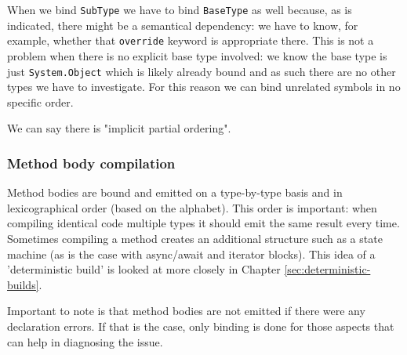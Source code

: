 When we bind \verb|SubType| we have to bind \verb|BaseType| as well because, as is indicated, there might be a semantical dependency: we have to know, for example, whether that \verb|override| keyword is appropriate there. This is not a problem when there is no explicit base type involved: we know the base type is just \verb|System.Object| which is likely already bound and as such there are no other types we have to investigate. For this reason we can bind unrelated symbols in no specific order.

\noindent We can say there is "implicit partial ordering".\parencite{Sadov2014}

\subsubsection{Method body compilation }
\label{sec:concur-symbol-binding}

Method bodies are bound and emitted on a type-by-type basis and in lexicographical order (based on the alphabet). This order is important: when compiling identical code multiple types it should emit the same result every time. Sometimes compiling a method creates an additional structure such as a state machine (as is the case with async/await and iterator blocks). This idea of a 'deterministic build' is looked at more closely in Chapter \ref{sec:deterministic-builds}. 

Important to note is that method bodies are not emitted if there were any declaration errors. If that is the case, only binding is done for those aspects that can help in diagnosing the issue.\parencite{Sadov2014}

